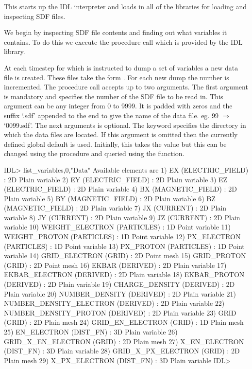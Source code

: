   This starts up the IDL interpreter and loads in all of the libraries
  for loading and inspecting SDF files.

  We begin by inspecting SDF file contents and finding out what variables
  it contains. To do this we execute the  procedure call
  which is provided by the {\EPOCH} IDL library.

  At each timestep for which {\EPOCH} is instructed to dump a set of variables a
  new data file is created. These files take the form . For
  each new dump the number is incremented.
  The procedure call accepts up to two arguments. The first argument is
  mandatory and specifies the number of the SDF file to be read in.
  This argument can be any integer from 0 to 9999.
  It is padded with zeros and the
  suffix `.sdf' appended to the end to give the name of the data file.
  eg. 99 $\Rightarrow$ `0099.sdf'. The next arguments is optional.
  The keyword  specifies the directory in which the data files
  are located. If this argument is omitted then the currently defined global
  default is used. Initially, this takes the value  but this can
  be changed using the  procedure and queried using the
   function.

\begin{boxverbatim}
IDL> list_variables,0,"Data"
Available elements are
1) EX (ELECTRIC_FIELD) : 2D Plain variable
2) EY (ELECTRIC_FIELD) : 2D Plain variable
3) EZ (ELECTRIC_FIELD) : 2D Plain variable
4) BX (MAGNETIC_FIELD) : 2D Plain variable
5) BY (MAGNETIC_FIELD) : 2D Plain variable
6) BZ (MAGNETIC_FIELD) : 2D Plain variable
7) JX (CURRENT) : 2D Plain variable
8) JY (CURRENT) : 2D Plain variable
9) JZ (CURRENT) : 2D Plain variable
10) WEIGHT_ELECTRON (PARTICLES) : 1D Point variable
11) WEIGHT_PROTON (PARTICLES) : 1D Point variable
12) PX_ELECTRON (PARTICLES) : 1D Point variable
13) PX_PROTON (PARTICLES) : 1D Point variable
14) GRID_ELECTRON (GRID) : 2D Point mesh
15) GRID_PROTON (GRID) : 2D Point mesh
16) EKBAR (DERIVED) : 2D Plain variable
17) EKBAR_ELECTRON (DERIVED) : 2D Plain variable
18) EKBAR_PROTON (DERIVED) : 2D Plain variable
19) CHARGE_DENSITY (DERIVED) : 2D Plain variable
20) NUMBER_DENSITY (DERIVED) : 2D Plain variable
21) NUMBER_DENSITY_ELECTRON (DERIVED) : 2D Plain variable
22) NUMBER_DENSITY_PROTON (DERIVED) : 2D Plain variable
23) GRID (GRID) : 2D Plain mesh
24) GRID_EN_ELECTRON (GRID) : 1D Plain mesh
25) EN_ELECTRON (DIST_FN) : 3D Plain variable
26) GRID_X_EN_ELECTRON (GRID) : 2D Plain mesh
27) X_EN_ELECTRON (DIST_FN) : 3D Plain variable
28) GRID_X_PX_ELECTRON (GRID) : 2D Plain mesh
29) X_PX_ELECTRON (DIST_FN) : 3D Plain variable
IDL>
\end{boxverbatim}

